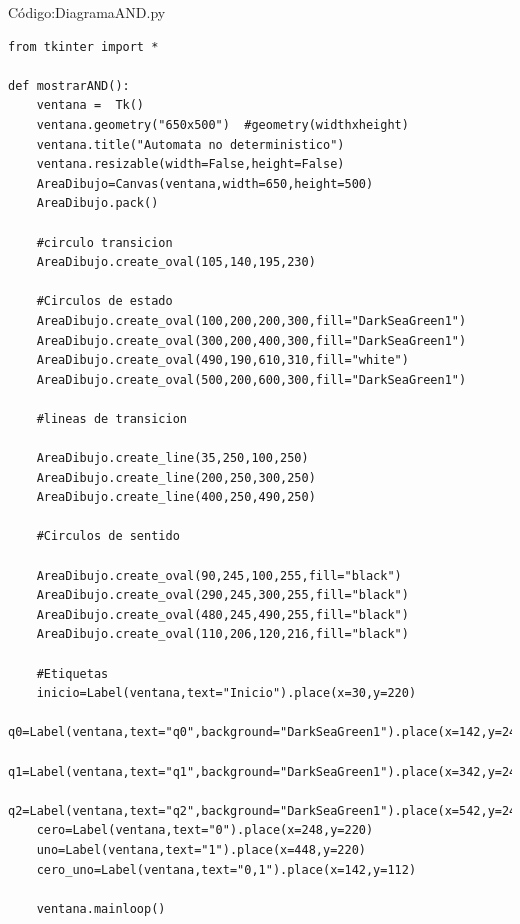 \documentclass[12pt,letterpaper]{article}
\begin{document}
C\'odigo:DiagramaAND.py\\
\lstset{language=Python, breaklines=true, basicstyle=\footnotesize}
\begin{lstlisting}[frame=single]
from tkinter import *

def mostrarAND():
	ventana =  Tk()
	ventana.geometry("650x500")  #geometry(widthxheight)
	ventana.title("Automata no deterministico")
	ventana.resizable(width=False,height=False)
	AreaDibujo=Canvas(ventana,width=650,height=500)
	AreaDibujo.pack()

	#circulo transicion
	AreaDibujo.create_oval(105,140,195,230)

	#Circulos de estado
	AreaDibujo.create_oval(100,200,200,300,fill="DarkSeaGreen1")
	AreaDibujo.create_oval(300,200,400,300,fill="DarkSeaGreen1")
	AreaDibujo.create_oval(490,190,610,310,fill="white")
	AreaDibujo.create_oval(500,200,600,300,fill="DarkSeaGreen1")

	#lineas de transicion

	AreaDibujo.create_line(35,250,100,250)
	AreaDibujo.create_line(200,250,300,250)
	AreaDibujo.create_line(400,250,490,250)

	#Circulos de sentido

	AreaDibujo.create_oval(90,245,100,255,fill="black")
	AreaDibujo.create_oval(290,245,300,255,fill="black")
	AreaDibujo.create_oval(480,245,490,255,fill="black")
	AreaDibujo.create_oval(110,206,120,216,fill="black")

	#Etiquetas
	inicio=Label(ventana,text="Inicio").place(x=30,y=220)
	q0=Label(ventana,text="q0",background="DarkSeaGreen1").place(x=142,y=245)
	q1=Label(ventana,text="q1",background="DarkSeaGreen1").place(x=342,y=245)
	q2=Label(ventana,text="q2",background="DarkSeaGreen1").place(x=542,y=245)
	cero=Label(ventana,text="0").place(x=248,y=220)
	uno=Label(ventana,text="1").place(x=448,y=220)
	cero_uno=Label(ventana,text="0,1").place(x=142,y=112)

	ventana.mainloop()
\end{lstlisting}
\vspace{1 cm}
\end{document}
